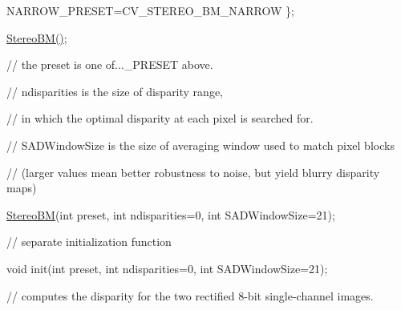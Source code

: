 {\ttfamily }

{\ttfamily }

{\ttfamily N\+A\+R\+R\+O\+W\+\_\+\+P\+R\+E\+S\+ET=C\+V\+\_\+\+S\+T\+E\+R\+E\+O\+\_\+\+B\+M\+\_\+\+N\+A\+R\+R\+OW \};}

{\ttfamily }

{\ttfamily }

{\ttfamily \mbox{\hyperlink{classorg_1_1opencv_1_1calib3d_1_1_stereo_b_m_acabf14c02b9ecb03e9e642284f0dfa81}{Stereo\+B\+M()}};}

{\ttfamily }

{\ttfamily }

{\ttfamily // the preset is one of...\+\_\+\+P\+R\+E\+S\+ET above.}

{\ttfamily }

{\ttfamily }

{\ttfamily // ndisparities is the size of disparity range,}

{\ttfamily }

{\ttfamily }

{\ttfamily // in which the optimal disparity at each pixel is searched for.}

{\ttfamily }

{\ttfamily }

{\ttfamily // S\+A\+D\+Window\+Size is the size of averaging window used to match pixel blocks}

{\ttfamily }

{\ttfamily }

{\ttfamily // (larger values mean better robustness to noise, but yield blurry disparity maps)}

{\ttfamily }

{\ttfamily }

{\ttfamily \mbox{\hyperlink{classorg_1_1opencv_1_1calib3d_1_1_stereo_b_m}{Stereo\+BM}}(int preset, int ndisparities=0, int S\+A\+D\+Window\+Size=21);}

{\ttfamily }

{\ttfamily }

{\ttfamily // separate initialization function}

{\ttfamily }

{\ttfamily }

{\ttfamily void init(int preset, int ndisparities=0, int S\+A\+D\+Window\+Size=21);}

{\ttfamily }

{\ttfamily }

{\ttfamily // computes the disparity for the two rectified 8-\/bit single-\/channel images.}

